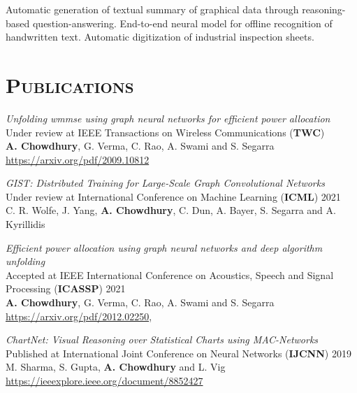 \begin{resume}
% 

\begin{position}
Automatic generation of textual summary of graphical data through reasoning-based question-answering. End-to-end neural model for offline recognition of handwritten text. Automatic digitization of industrial inspection sheets.
 
\end{position}


\section{\textsc{Publications}}

\textit{Unfolding wmmse using graph neural networks for efficient power allocation}\\
Under review at IEEE Transactions on Wireless Communications (\textbf{TWC})\\
\textbf{A. Chowdhury}, G. Verma, C. Rao, A. Swami and S. Segarra\\
\url{https://arxiv.org/pdf/2009.10812}

\textit{GIST: Distributed Training for Large-Scale Graph Convolutional Networks}\\
Under review at International Conference on Machine Learning (\textbf{ICML}) 2021\\
C. R. Wolfe, J. Yang, \textbf{A. Chowdhury}, C. Dun, A. Bayer, S. Segarra and A. Kyrillidis

\textit{Efficient power allocation using graph neural networks and deep algorithm unfolding}\\
Accepted at IEEE International Conference on Acoustics, Speech and Signal Processing (\textbf{ICASSP}) 2021\\ 
\textbf{A. Chowdhury}, G. Verma, C. Rao, A. Swami and S. Segarra\\  \url{https://arxiv.org/pdf/2012.02250},

\textit{ChartNet: Visual Reasoning over Statistical Charts using MAC-Networks}\\
Published at International Joint Conference on Neural Networks (\textbf{IJCNN}) 2019\\
M. Sharma, S. Gupta, \textbf{A. Chowdhury} and L. Vig\\
\url{https://ieeexplore.ieee.org/document/8852427}


\end{resume}
